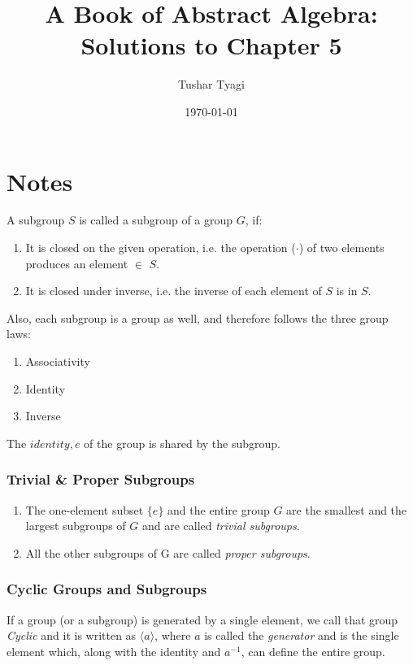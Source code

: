 \documentclass[12pt]{article}
\begin{document}
\title{A Book of Abstract Algebra: Solutions to Chapter 5}
\author{Tushar Tyagi}
\date{\today}
\maketitle

\section*{Notes}
A subgroup $S$ is called a subgroup of a group $G$, if:
\begin{enumerate}
  
\item It is closed on the given operation, i.e. the operation ($\cdot$) of two elements produces an element $\in$ $S$.
\item It is closed under inverse, i.e. the inverse of each element of $S$ is in $S$.
\end{enumerate}

Also, each subgroup is a group as well, and therefore follows the three group laws:
\begin{enumerate}
  \item Associativity
  \item Identity
  \item Inverse
\end{enumerate}

The $identity, e$ of the group is shared by the subgroup.

\subsubsection*{Trivial \& Proper Subgroups}
\begin{enumerate}
 \item The one-element subset $\{e\}$ and the entire group $G$ are the smallest and the largest subgroups of $G$ and are called \textit{trivial subgroups}.
 \item All the other subgroups of G are called \textit{proper subgroups}.
\end{enumerate}


\subsubsection*{Cyclic Groups and Subgroups}
If a group (or a subgroup) is generated by a single element, we call that group
\textit{Cyclic} and it is written as $\langle a \rangle $, where $a$ is called the \textit{generator} and is the single element which, along with the identity and $a^{-1}$, can define the entire group. 
\end{document}
